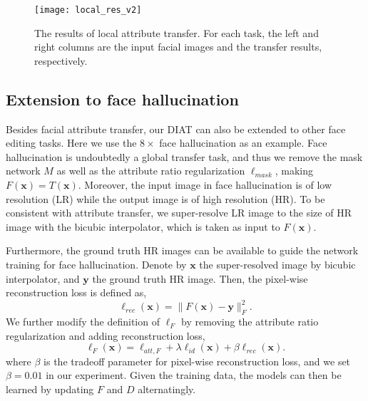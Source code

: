 \documentclass[journal]{IEEEtran}
\begin{document}
\begin{figure*}
\begin{center}
\texttt{[image: local\_res\_v2]}
\end{center}
   \caption{The results of local attribute transfer. For each task, the left and right columns are the input facial images and the transfer results, respectively.}
\label{local_results}
\end{figure*}

\subsection{Extension to face hallucination}\label{sec:facehallucinationmodel}
Besides facial attribute transfer, our DIAT can also be extended to other face editing tasks.
Here we use the $8\times$ face hallucination as an example.
Face hallucination is undoubtedly a global transfer task, and thus we remove the mask network $M$ as well as the attribute ratio regularization $\ell_{mask}$, making $F(\mathbf{x}) = T(\mathbf{x})$.
Moreover, the input image in face hallucination is of low resolution (LR) while the output image is of high resolution (HR).
To be consistent with attribute transfer, we super-resolve LR image to the size of HR image with the bicubic interpolator, which is taken as input to $F(\mathbf{x})$.



Furthermore, the ground truth HR images can be available to guide the network training for face hallucination.
Denote by $\mathbf{x}$ the super-resolved image by bicubic interpolator, and $\mathbf{y}$ the ground truth HR image.
Then, the pixel-wise reconstruction loss is defined as,
\begin{equation}
\label{eqn:rec_loss}
\ell_{rec}(\mathbf{x})= \|F(\mathbf{x})-\mathbf{y}\|_F^2.
\end{equation}
We further modify the definition of $\ell_F$ by removing the attribute ratio regularization and adding reconstruction loss,
\begin{equation}
\label{eqn:lossF_hall}
\ell_{F}(\mathbf{x}) = \ell_{att,F} + \lambda\ell_{id}(\mathbf{x}) + \beta \ell_{rec}(\mathbf{x}).
\end{equation}
where $\beta$ is the tradeoff parameter for pixel-wise reconstruction loss, and we set $\beta = 0.01$ in our experiment.
Given the training data, the models can then be learned by updating $F$ and $D$ alternatingly.
\end{document}
